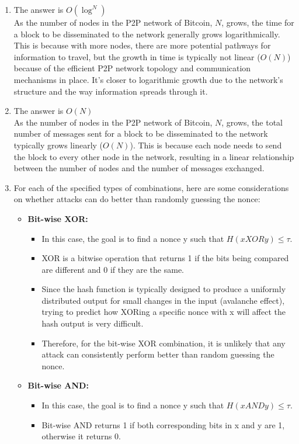 \documentclass{report}
\begin{document}
\begin{enumerate}
	\item The answer is $O(\log^{N})$\\
	As the number of nodes in the P2P network of Bitcoin, $N$, grows, the time for a block to be disseminated to the network generally grows logarithmically. This is because with more nodes, there are more potential pathways for information to travel, but the growth in time is typically not linear ($O(N)$) because of the efficient P2P network topology and communication mechanisms in place. It's closer to logarithmic growth due to the network's structure and the way information spreads through it. 
	\item The answer is $O(N)$\\
	As the number of nodes in the P2P network of Bitcoin, $N$, grows, the total number of messages sent for a block to be disseminated to the network typically grows linearly ($O(N)$). This is because each node needs to send the block to every other node in the network, resulting in a linear relationship between the number of nodes and the number of messages exchanged.
	\item For each of the specified types of combinations, here are some considerations on whether attacks can do better than randomly guessing the nonce:
	\begin{itemize}
		\item \textbf{Bit-wise XOR:} 
		\begin{itemize}
			\item In this case, the goal is to find a nonce y such that $H(x XOR y) \leq \tau$.
			\item XOR is a bitwise operation that returns 1 if the bits being compared are different and 0 if they are the same.
			\item Since the hash function is typically designed to produce a uniformly distributed output for small changes in the input (avalanche effect), trying to predict how XORing a specific nonce with x will affect the hash output is very difficult.
			\item Therefore, for the bit-wise XOR combination, it is unlikely that any attack can consistently perform better than random guessing the nonce.
		\end{itemize}
		\item \textbf{Bit-wise AND:}
		\begin{itemize}
			\item In this case, the goal is to find a nonce y such that $H(x AND y) \leq \tau$.
			\item Bit-wise AND returns 1 if both corresponding bits in x and y are 1, otherwise it returns 0.

\end{itemize}
\end{itemize}
\end{enumerate}
\end{document}
